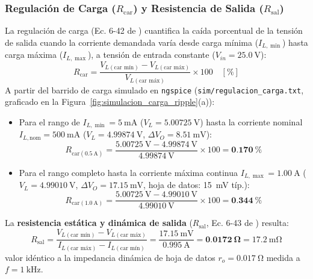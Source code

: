 \subsubsection{Regulación de Carga ($R_{\text{car}}$) y Resistencia de Salida ($R_{\text{sal}}$)}
La regulación de carga (Ec. 6-42 de \cite{gonzalez_p2}) cuantifica la caída porcentual de la tensión de salida cuando la corriente demandada varía desde carga mínima ($I_{L,\min}$) hasta carga máxima ($I_{L,\max}$), a tensión de entrada constante ($V_{in} = \SI{25,0}{\volt}$):
\begin{equation}
    R_{\text{car}} = \frac{V_{L(\text{car mín})} - V_{L(\text{car máx})}}{V_{L(\text{car máx})}} \times 100 \quad [\%]
    \label{eq:rcar_def}
\end{equation}
A partir del barrido de carga simulado en \texttt{ngspice} (\texttt{sim/regulacion\_carga.txt}, graficado en la Figura~\ref{fig:simulacion_carga_ripple}(a)):
\begin{itemize}
    \item Para el rango de $I_{L,\min} = \SI{5}{\milli\ampere}$ ($V_L = \SI{5,00725}{\volt}$) hasta la corriente nominal $I_{L,\text{nom}} = \SI{500}{\milli\ampere}$ ($V_L = \SI{4,99874}{\volt}$, $\Delta V_O = \SI{8,51}{\milli\volt}$):
    \begin{equation}
        R_{\text{car}(\SI{0,5}{\ampere})} = \frac{\SI{5,00725}{\volt} - \SI{4,99874}{\volt}}{\SI{4,99874}{\volt}} \times 100 = \mathbf{\SI{0,170}{\percent}}
    \end{equation}
    \item Para el rango completo hasta la corriente máxima continua $I_{L,\max} = \SI{1,00}{\ampere}$ ($V_L = \SI{4,99010}{\volt}$, $\Delta V_O = \SI{17,15}{\milli\volt}$, hoja de datos: \SI{15}{\milli\volt} típ.):
    \begin{equation}
        R_{\text{car}(\SI{1,0}{\ampere})} = \frac{\SI{5,00725}{\volt} - \SI{4,99010}{\volt}}{\SI{4,99010}{\volt}} \times 100 = \mathbf{\SI{0,344}{\percent}}
    \end{equation}
\end{itemize}
La \textbf{resistencia estática y dinámica de salida} ($R_{\text{sal}}$, Ec. 6-43 de \cite{gonzalez_p2}) resulta:
\begin{equation}
    R_{\text{sal}} = \frac{V_{L(\text{car mín})} - V_{L(\text{car máx})}}{I_{L(\text{car máx})} - I_{L(\text{car mín})}} = \frac{\SI{17,15}{\milli\volt}}{\SI{0,995}{\ampere}} = \mathbf{\SI{0,0172}{\ohm}} = \SI{17,2}{\milli\ohm}
    \label{eq:rsal_calc}
\end{equation}
valor idéntico a la impedancia dinámica de hoja de datos $r_o = \SI{0,017}{\ohm}$ medida a $f = \SI{1}{\kilo\hertz}$.

